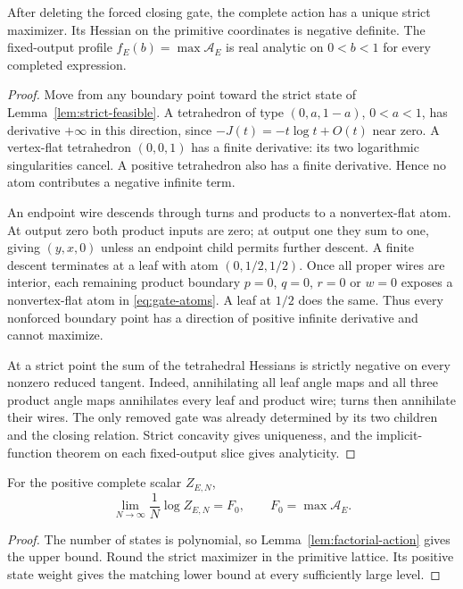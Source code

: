 \begin{proposition}\label{prop:strict-maximum}
After deleting the forced closing gate, the complete action has a unique strict maximizer. Its Hessian on the primitive coordinates is negative definite. The fixed-output profile $f_E(b)=\max\mathcal A_E$ is real analytic on $0<b<1$ for every completed expression.
\end{proposition}
\begin{proof}
Move from any boundary point toward the strict state of Lemma~\ref{lem:strict-feasible}. A tetrahedron of type $(0,a,1-a)$, $0<a<1$, has derivative $+\infty$ in this direction, since $-J(t)=-t\log t+O(t)$ near zero. A vertex-flat tetrahedron $(0,0,1)$ has a finite derivative: its two logarithmic singularities cancel. A positive tetrahedron also has a finite derivative. Hence no atom contributes a negative infinite term.

An endpoint wire descends through turns and products to a nonvertex-flat atom. At output zero both product inputs are zero; at output one they sum to one, giving $(y,x,0)$ unless an endpoint child permits further descent. A finite descent terminates at a leaf with atom $(0,1/2,1/2)$. Once all proper wires are interior, each remaining product boundary $p=0$, $q=0$, $r=0$ or $w=0$ exposes a nonvertex-flat atom in \eqref{eq:gate-atoms}. A leaf at $1/2$ does the same. Thus every nonforced boundary point has a direction of positive infinite derivative and cannot maximize.

At a strict point the sum of the tetrahedral Hessians is strictly negative on every nonzero reduced tangent. Indeed, annihilating all leaf angle maps and all three product angle maps annihilates every leaf and product wire; turns then annihilate their wires. The only removed gate was already determined by its two children and the closing relation. Strict concavity gives uniqueness, and the implicit-function theorem on each fixed-output slice gives analyticity.
\end{proof}

\begin{corollary}\label{cor:complete-limit}
For the positive complete scalar $Z_{E,N}$,
\[
 \lim_{N\to\infty}\frac1N\log Z_{E,N}=F_0,
 \qquad F_0=\max\mathcal A_E.
\]
\end{corollary}
\begin{proof}
The number of states is polynomial, so Lemma~\ref{lem:factorial-action} gives the upper bound. Round the strict maximizer in the primitive lattice. Its positive state weight gives the matching lower bound at every sufficiently large level.
\end{proof}

